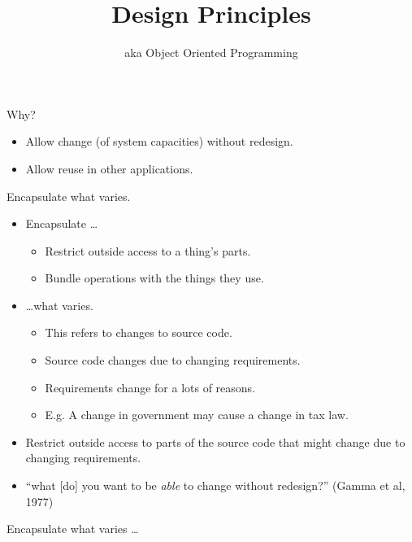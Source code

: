 \documentclass{beamer}
\title{Design Principles}
\subtitle{aka Object Oriented Programming}
\begin{document}
\begin{frame}
  \titlepage
\end{frame}

\begin{frame}{Why?}

    \begin{itemize}
        \item Allow change (of system capacities) without redesign.
        \item Allow reuse in other applications.
    \end{itemize}

\end{frame}

\begin{frame}{Encapsulate what varies.}
    \begin{itemize}
        \item Encapsulate \ldots
            \begin{itemize}
                \item Restrict outside access to a thing's parts.
                \item Bundle operations with the things they use.
            \end{itemize}
        \item \ldots what varies.
            \begin{itemize}
                \item This refers to changes to source code.
                \item Source code changes due to changing requirements.
                \item Requirements change for a lots of reasons.
                \item E.g. A change in government may cause a change in tax law.
            \end{itemize}
        \item Restrict outside access to parts of the source code that might change due to changing requirements.
        \item ``what [do] you want to be \textit{able} to change without redesign?'' (Gamma et al, 1977)
    \end{itemize}
\end{frame}

\begin{frame}{Encapsulate what varies \ldots}
    \begin{columns}
        \column{\dimexpr\paperwidth-40pt}
        
    \end{columns}
\end{frame}
\end{document}
